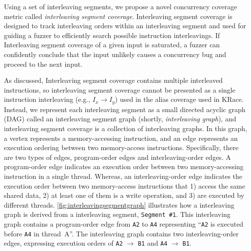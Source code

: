 \newcommand{\mutable}{mutable edge\xspace}
\newcommand{\mutables}{mutable edges\xspace}
\newcommand{\immutable}{immutable edge\xspace}
\newcommand{\immutables}{immutable edges\xspace}
\newcommand{\intcov}{interleaving segment coverage\xspace}
\newcommand{\Intcov}{Interleaving segment coverage\xspace}


Using a set of interleaving segments, we propose a novel concurrency coverage metric called \textit{\intcov}.
\Intcov is designed to track interleaving orders
within an interleaving segment and used for guiding a fuzzer to  
efficiently search possible instruction interleavings.
If \Intcov of a given input is saturated, 
a fuzzer can confidently conclude that the input unlikely causes a concurrency bug and proceed to the next input.

As discussed, \Intcov contains multiple interleaved instructions, 
so \intcov cannot be presented as a single instruction interleaving 
(e.g., $I_x \rightarrow I_y$) used in the alias coverage used in KRace.
Instead, we represent each interleaving segment as a small directed acyclic
graph (DAG) called an interleaving segment graph (shortly, \textit{interleaving graph}), and \intcov is a collection of interleaving graphs.
%
In this graph, a vertex represents a memory-accessing instruction, 
and an edge represents an execution ordering between two memory-access instructions. 
Specifically, there are two types of edges, program-order edges and
interleaving-order edges.
%
A program-order edge indicates an execution order between two 
memory-accessing instruction in a single thread.
Whereas, an interleaving-order edge indicates the execution
order between two memory-access instructions that 1) access the same
shared data, 2) at least one of them is a write operation, and 3) are
executed by different threads.
\autoref{fig:interleavingsegmentgraph} illustrates how a interleaving 
graph is derived from a interleaving segment, \texttt{Segment \#1}.
This interleaving graph contains a program-order edge from \texttt{A2} to
\texttt{A4} representing ``\texttt{A2} is executed before \texttt{A4}
in thread~A''.
The interleaving graph contains two interleaving-order
edges, expressing execution orders of \texttt{A2} $\rightarrow$ \texttt{B1}
and \texttt{A4} $\rightarrow$ \texttt{B1}.



